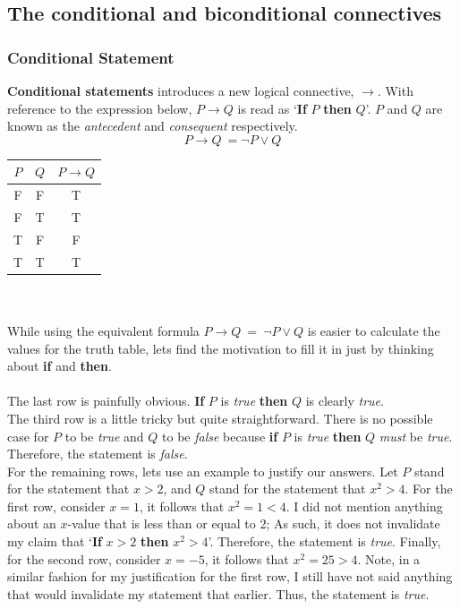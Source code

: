 \documentclass[../setup.tex]{subfiles}
\begin{document}
\subsection{The conditional and biconditional connectives}
\subsubsection{Conditional Statement}
\begin{theorem}
 \textbf{Conditional statements} introduces a new logical connective, $\rightarrow$. With reference to the expression below, $P\rightarrow Q$ is read as `\textbf{If} $P$ \textbf{then} $Q$'. $P$ and $Q$ are known as the \textit{antecedent} and \textit{consequent} respectively.
\[P\rightarrow Q\ = \lnot P \lor Q \]
\end{theorem}



\begin{center}
	\begin{tabular}[t]{| c | c | c |}
		\hline
		$P$ & $Q$ & $P\rightarrow Q$ \\
		\hline
		F & F & T \\
		F & T & T \\
		T & F & F \\ 
		T & T & T \\
		\hline
	\end{tabular}
\end{center}
\phantom \\ \\
While using the equivalent formula $P\rightarrow Q\ =\ \lnot P \lor Q$ is easier to calculate the values for the truth table, lets find the motivation to fill it in just by thinking about \textbf{if} and \textbf{then}. \\
\\
The last row is painfully obvious. \textbf{If} $P$ is \textit{true} \textbf{then} $Q$ is clearly \textit{true}. \\
The third row is a little tricky but quite straightforward. There is no possible case for $P$ to be \textit{true} and $Q$ to be \textit{false} because \textbf{if} $P$ is \textit{true} \textbf{then} $Q$ \textit{must} be \textit{true}. Therefore, the statement is \textit{false}. \\
For the remaining rows, lets use an example to justify our answers. Let $P$ stand for the statement that $x > 2$, and $Q$ stand for the statement that $x^2 > 4$. For the first row, consider $x = 1$, it follows that $x^2 = 1 < 4$. I did not mention anything about an $x$-value that is less than or equal to 2; As such, it does not invalidate my claim that `\textbf{If} $x > 2$ \textbf{then} $x^2 > 4$'. Therefore, the statement is \textit{true}. Finally, for the second row, consider $x = -5$, it follows that $x^2 = 25 > 4$. Note, in a similar fashion for my justification for the first row, I still have not said anything that would invalidate my statement that earlier. Thus, the statement is \textit{true}. 
\end{document}
